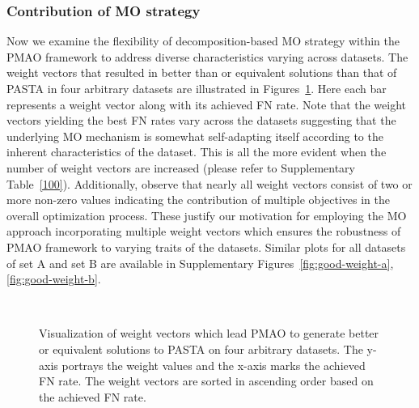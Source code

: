 \subsubsection{Contribution of MO strategy}
Now we examine the flexibility of decomposition-based MO strategy within the PMAO framework to address diverse characteristics varying across datasets. The weight vectors that resulted in better than or equivalent solutions than that of PASTA in four arbitrary datasets are illustrated in Figures~\ref{fig:good-weight}. Here each bar represents a weight vector along with its achieved FN rate.  Note that the weight vectors yielding the best FN rates vary across the datasets suggesting that the underlying MO mechanism is somewhat self-adapting itself according to the inherent characteristics of the dataset. This is all the more evident when the number of weight vectors are increased (please refer to Supplementary Table~\ref{100}). Additionally, observe that nearly all weight vectors consist of two or more non-zero values indicating the contribution of multiple objectives in the overall optimization process. These justify our motivation for employing the MO approach incorporating multiple weight vectors which ensures the robustness of PMAO framework to varying traits of the datasets. Similar plots for all datasets of set A and set B are available in Supplementary Figures~\ref{fig:good-weight-a}, \ref{fig:good-weight-b}.

\begin{figure}[!htbp]%
	\begin{adjustwidth}{-0.6cm}{}
		\centering
		\\
	\end{adjustwidth}
	\caption{Visualization of weight vectors which lead PMAO to generate better or equivalent solutions to PASTA on four arbitrary datasets. The y-axis portrays the weight values and the x-axis marks the achieved FN rate. The weight vectors are sorted in ascending order based on the achieved FN rate. }
	\label{fig:good-weight}
\end{figure}


